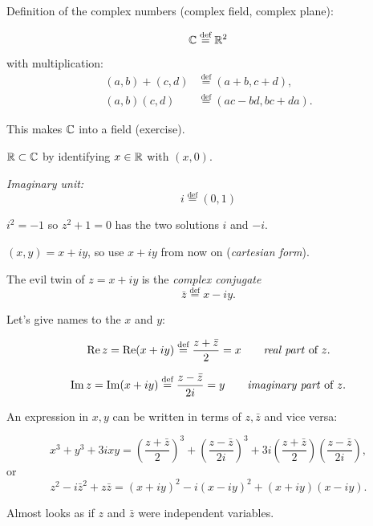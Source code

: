 \documentclass[10pt,aspectratio=169]{beamer}
\begin{document}
\begin{frame}
Definition of the complex numbers (complex field, complex plane):

\[
\C \overset{\text{def}}{=} \R^2
\]

with multiplication:
\begin{align*}
(a,b) + (c,d) & \overset{\text{def}}{=} (a+b,c+d) , \\
(a,b) (c,d) & \overset{\text{def}}{=} (ac-bd,bc+da) .
\end{align*}

\pause

This makes $\C$ into a field (exercise).

\pause
\medskip

$\R \subset \C$ by identifying $x \in \R$ with $(x,0)$.

\pause
\medskip

\emph{Imaginary unit:}
\[
i \overset{\text{def}}{=} (0,1)
\]

\pause
\medskip

$
i^2 = -1
$
\qquad so
$z^2+1=0$ has the two solutions $i$ and $-i$.
\end{frame}

\begin{frame}

$(x,y) = x+iy$, so use $x+iy$ from now on (\emph{cartesian form}).

\medskip
\pause

The evil twin of $z=x+iy$ is the \emph{complex conjugate}
\[
\bar{z} \overset{\text{def}}{=} x-iy.
\]

\medskip
\pause

Let's give names to the $x$ and $y$:

\[
\Re z = 
\Re (x+iy)
\overset{\text{def}}{=}
\frac{z+\bar{z}}{2}
= x
\qquad \text{\emph{real part} of } z .
\]

\pause

\[
\Im z = 
\Im (x+iy)
\overset{\text{def}}{=}
\frac{z-\bar{z}}{2i}
= y
\qquad \text{\emph{imaginary part} of } z .
\]

\pause

An expression in $x,y$ can be written in terms of $z,\bar{z}$
and vice versa:

\[
x^3 + y^3 + 3ixy
=
{\left( \frac{z+ \bar{z}}{2} \right)}^3 + 
{\left( \frac{z- \bar{z}}{2i} \right)}^3 + 
3i {\left( \frac{z+ \bar{z}}{2} \right)} 
{\left( \frac{z- \bar{z}}{2i} \right)} ,
\]
\pause
or
\[
z^2 - i \bar{z}^2 + z \bar{z}
=
{(x+iy)}^2 - i {(x-iy)}^2 + 
(x+iy)(x-iy) .
\]
\pause

Almost looks as if $z$ and $\bar{z}$ were independent variables.
\end{frame}
\end{document}
